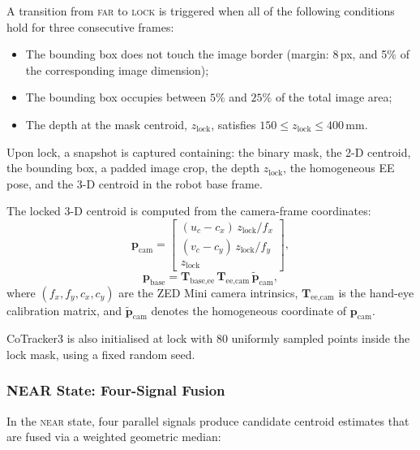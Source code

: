 \documentclass[lettersize,journal]{IEEEtran}
\begin{document}
A transition from \textsc{far} to \textsc{lock} is triggered when all of the
following conditions hold for three consecutive frames:
\begin{itemize}
  \item The bounding box does not touch the image border (margin: 8\,px, and
        5\% of the corresponding image dimension);
  \item The bounding box occupies between $5\%$ and $25\%$ of the total image
        area;
  \item The depth at the mask centroid, $z_{\text{lock}}$, satisfies
        $150 \leq z_{\text{lock}} \leq 400$\,mm.
\end{itemize}
Upon lock, a snapshot is captured containing: the binary mask, the 2-D
centroid, the bounding box, a padded image crop, the depth
$z_{\text{lock}}$, the homogeneous EE pose, and the 3-D centroid in
the robot base frame.

The locked 3-D centroid is computed from the camera-frame coordinates:
\begin{equation}
  \mathbf{p}_{\text{cam}} =
    \begin{bmatrix}
      (u_c - c_x)\,z_{\text{lock}} / f_x \\
      (v_c - c_y)\,z_{\text{lock}} / f_y \\
      z_{\text{lock}}
    \end{bmatrix},
  \label{eq:backproject}
\end{equation}
\begin{equation}
  \mathbf{p}_{\text{base}} =
    \mathbf{T}_{\text{base,ee}}\,\mathbf{T}_{\text{ee,cam}}\,
    \tilde{\mathbf{p}}_{\text{cam}},
  \label{eq:transform}
\end{equation}
where $(f_x, f_y, c_x, c_y)$ are the ZED Mini camera intrinsics,
$\mathbf{T}_{\text{ee,cam}}$ is the hand-eye calibration matrix, and
$\tilde{\mathbf{p}}_{\text{cam}}$ denotes the homogeneous coordinate of
$\mathbf{p}_{\text{cam}}$.

CoTracker3 is also initialised at lock with 80 uniformly sampled points
inside the lock mask, using a fixed random seed.

\subsubsection{NEAR State: Four-Signal Fusion}

In the \textsc{near} state, four parallel signals produce candidate centroid
estimates that are fused via a weighted geometric median:
\end{document}
